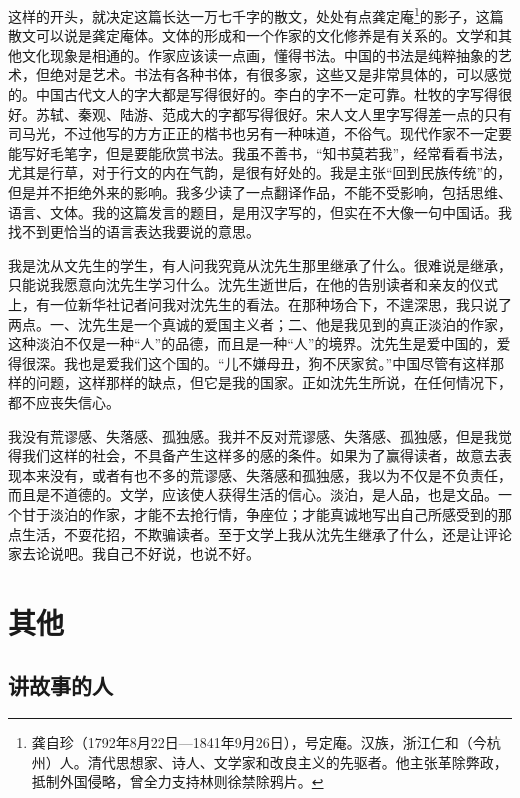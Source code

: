 \documentclass[12pt,a5paper]{ctexbook}
\begin{document}
这样的开头，就决定这篇长达一万七千字的散文，处处有点龚定庵\footnote{龚自珍（1792年8月22日—1841年9月26日），号定庵。汉族，浙江仁和（今杭州）人。清代思想家、诗人、文学家和改良主义的先驱者。他主张革除弊政，抵制外国侵略，曾全力支持林则徐禁除鸦片。}的影子，这篇散文可以说是龚定庵体。文体的形成和一个作家的文化修养是有关系的。文学和其他文化现象是相通的。作家应该读一点画，懂得书法。中国的书法是纯粹抽象的艺术，但绝对是艺术。书法有各种书体，有很多家，这些又是非常具体的，可以感觉的。中国古代文人的字大都是写得很好的。李白的字不一定可靠。杜牧的字写得很好。苏轼、秦观、陆游、范成大的字都写得很好。宋人文人里字写得差一点的只有司马光，不过他写的方方正正的楷书也另有一种味道，不俗气。现代作家不一定要能写好毛笔字，但是要能欣赏书法。我虽不善书，“知书莫若我”，经常看看书法，尤其是行草，对于行文的内在气韵，是很有好处的。我是主张“回到民族传统”的，但是并不拒绝外来的影响。我多少读了一点翻译作品，不能不受影响，包括思维、语言、文体。我的这篇发言的题目，是用汉字写的，但实在不大像一句中国话。我找不到更恰当的语言表达我要说的意思。

我是沈从文先生的学生，有人问我究竟从沈先生那里继承了什么。很难说是继承，只能说我愿意向沈先生学习什么。沈先生逝世后，在他的告别读者和亲友的仪式上，有一位新华社记者问我对沈先生的看法。在那种场合下，不遑深思，我只说了两点。一、沈先生是一个真诚的爱国主义者；二、他是我见到的真正淡泊的作家，这种淡泊不仅是一种“人”的品德，而且是一种“人”的境界。沈先生是爱中国的，爱得很深。我也是爱我们这个国的。“儿不嫌母丑，狗不厌家贫。”中国尽管有这样那样的问题，这样那样的缺点，但它是我的国家。正如沈先生所说，在任何情况下，都不应丧失信心。

我没有荒谬感、失落感、孤独感。我并不反对荒谬感、失落感、孤独感，但是我觉得我们这样的社会，不具备产生这样多的感的条件。如果为了赢得读者，故意去表现本来没有，或者有也不多的荒谬感、失落感和孤独感，我以为不仅是不负责任，而且是不道德的。文学，应该使人获得生活的信心。淡泊，是人品，也是文品。一个甘于淡泊的作家，才能不去抢行情，争座位；才能真诚地写出自己所感受到的那点生活，不耍花招，不欺骗读者。至于文学上我从沈先生继承了什么，还是让评论家去论说吧。我自己不好说，也说不好。

\newpage

\chapter{其他}

\section{讲故事的人}
\end{document}
